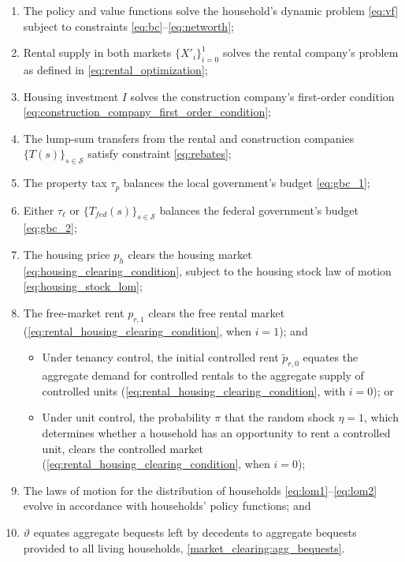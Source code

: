 \documentclass[parskip=full]{article}
\begin{document}
\begin{enumerate}
\item The policy and value functions solve the household's dynamic problem \eqref{eq:vf} subject to constraints \eqref{eq:bc}--\eqref{eq:networth};
\item Rental supply in both markets $\{X'_{i}\}^{1}_{i=0}$ solves the rental company's problem as defined in \eqref{eq:rental_optimization};
\item Housing investment $I$ solves the construction company's first-order condition \eqref{eq:construction_company_first_order_condition};
\item The lump-sum transfers from the rental and construction companies $\{T(s)\}_{s \in \mathcal{S}}$ satisfy constraint \eqref{eq:rebates};
\item The property tax $\tau_p$ balances the local government's budget \eqref{eq:gbc_1};
\item Either $\tau_{\ell}$ or $\{T_{fed}(s)\}_{s\in \mathcal{S}}$ balances the federal government's budget \eqref{eq:gbc_2};
\item The housing price $p_h$ clears the housing market
\eqref{eq:housing_clearing_condition}, subject to the housing stock law of motion \eqref{eq:housing_stock_lom};
\item The free-market rent $p_{r,1}$ clears the free rental market (\eqref{eq:rental_housing_clearing_condition}, when $i=1$); and
\begin{itemize}
    \item Under tenancy control, the initial controlled rent $\tilde{p}_{r,0}$ equates the aggregate demand for controlled rentals to the aggregate supply of controlled units (\eqref{eq:rental_housing_clearing_condition}, with $i=0$); or
    \item Under unit control, the probability $\pi$ that the random shock $\eta=1$, which determines whether a household has an opportunity to rent a controlled unit, clears the controlled market (\eqref{eq:rental_housing_clearing_condition}, when $i=0$);
\end{itemize}
\item The laws of motion for the distribution of households \eqref{eq:lom1}--\eqref{eq:lom2} evolve in accordance with households' policy functions; and
\item $\vartheta$ equates aggregate bequests left by decedents to aggregate bequests provided to all living households, \eqref{market_clearing:agg_bequests}.
\end{enumerate}
\end{document}
